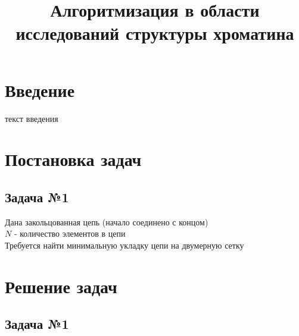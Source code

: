 \documentclass{article}
\begin{document}
\title{Алгоритмизация в области исследований структуры хроматина}
\maketitle
\section{Введение}
текст введения
\section{Постановка задач}
\subsection{Задача №1}
Дана закольцованная цепь (начало соединено с концом)
\\$N$ - количество элементов в цепи
\\Требуется найти минимальную укладку цепи на двумерную сетку
\section{Решение задач}
\subsection{Задача №1}
\end{document}

